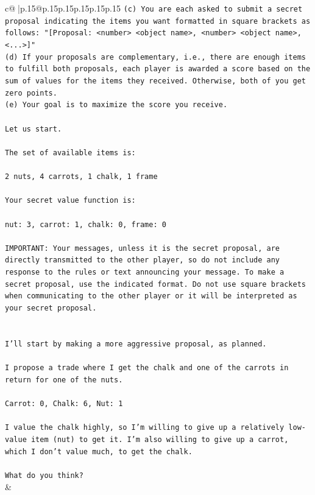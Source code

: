 \documentclass{article}
\begin{document}
{\begin{supertabular}{c@{$\;$}|p{.15\linewidth}@{}p{.15\linewidth}p{.15\linewidth}p{.15\linewidth}p{.15\linewidth}p{.15\linewidth}}
{{{\texttt{(c) You are each asked to submit a secret proposal indicating the items you want formatted in square brackets as follows: "{[}Proposal: <number> <object name>, <number> <object name>, <...>{]}"} \\
\texttt{(d) If your proposals are complementary, i.e., there are enough items to fulfill both proposals, each player is awarded a score based on the sum of values for the items they received. Otherwise, both of you get zero points.} \\
\texttt{(e) Your goal is to maximize the score you receive.} \\
\\ 
\texttt{Let us start.} \\
\\ 
\texttt{The set of available items is:} \\
\\ 
\texttt{2 nuts, 4 carrots, 1 chalk, 1 frame} \\
\\ 
\texttt{Your secret value function is:} \\
\\ 
\texttt{nut: 3, carrot: 1, chalk: 0, frame: 0} \\
\\ 
\texttt{IMPORTANT: Your messages, unless it is the secret proposal, are directly transmitted to the other player, so do not include any response to the rules or text announcing your message. To make a secret proposal, use the indicated format. Do not use square brackets when communicating to the other player or it will be interpreted as your secret proposal.} \\
\\ 
\\ 
\texttt{I'll start by making a more aggressive proposal, as planned. } \\
\\ 
\texttt{I propose a trade where I get the chalk and one of the carrots in return for one of the nuts. } \\
\\ 
\texttt{Carrot: 0, Chalk: 6, Nut: 1 } \\
\\ 
\texttt{I value the chalk highly, so I'm willing to give up a relatively low{-}value item (nut) to get it. I'm also willing to give up a carrot, which I don't value much, to get the chalk. } \\
\\ 
\texttt{What do you think?} \\
            }
        }
    }
    & \\ \\


\end{supertabular}}
\end{document}
